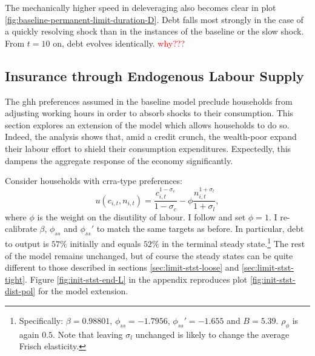\documentclass[12pt]{article} %
\numberwithin{equation}{section} %
\numberwithin{figure}{section}
\numberwithin{table}{section}
\begin{document}
The mechanically higher speed in deleveraging also becomes clear in plot \ref{fig:baseline-permanent-limit-duration-D}. Debt falls most strongly in the case of a quickly resolving shock than in the instances of the baseline or the slow shock. From $t=10$ on, debt evolves identically. \textcolor{red}{why???}


\subsection{Insurance through Endogenous Labour Supply}
\label{sec:sensitivity-end-labour}

The \Gls{ghh} preferences assumed in the baseline model preclude households from adjusting working hours in order to absorb shocks to their consumption. This section explores an extension of the model which allows households to do so. Indeed, the analysis shows that, amid a credit crunch, the wealth-poor expand their labour effort to shield their consumption expenditures. Expectedly, this dampens the aggregate response of the economy significantly.

Consider households with \Gls{crra}-type preferences:
\begin{equation}
    u(c_{i,t}, n_{i,t}) = \frac{c_{i,t}^{1-\sigma_c}}{1-\sigma_c} - \phi \frac{n_{i,t}^{1+\sigma_l}}{1+\sigma_l}, \label{eq:hh-crra-utility}
\end{equation}
where $\phi$ is the weight on the disutility of labour. I follow \textcite{mckay2016} and set $\phi=1$. I re-calibrate $\beta$, $\phi_{ss}$ and $\phi_{ss}'$ to match the same targets as before. In particular, debt to output is $57\%$ initially and equals $52\%$ in the terminal steady state.\footnote{Specifically: $\beta = 0.98801$, $\phi_{ss} = -1.7956$, $\phi_{ss}' = -1.655$ and $B = 5.39$. $\rho_{\phi}$ is again $0.5$. Note that leaving $\sigma_l$ unchanged is likely to change the average Frisch elasticity.} The rest of the model remains unchanged, but of course the steady states can be quite different to those described in sections \ref{sec:limit-stst-loose} and \ref{sec:limit-stst-tight}. Figure \ref{fig:init-stst-end-L} in the appendix reproduces plot \ref{fig:init-stst-dist-pol} for the model extension.
\end{document}
